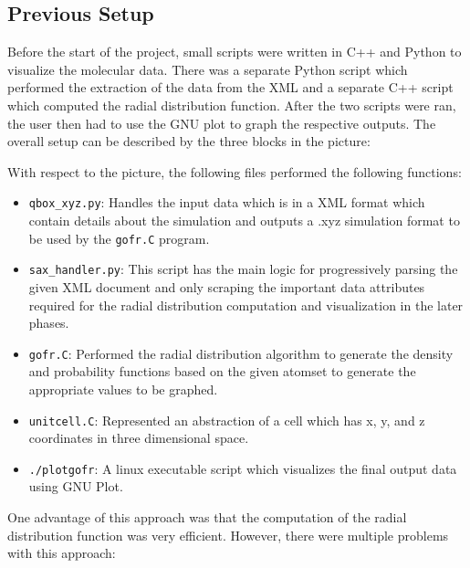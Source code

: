 
\subsection*{Previous Setup}

Before the start of the project, small scripts were written in C++ and Python to visualize the molecular data. There was a separate Python script which performed the extraction of the data from the XML and a separate C++ script which computed the radial distribution function. After the two scripts were ran, the user then had to use the GNU plot to graph the respective outputs. The overall setup can be described by the three blocks in the picture:





With respect to the picture, the following files performed the following functions: 

\begin{itemize}
        
    \item \verb|qbox_xyz.py|: Handles the input data which is in a XML format which contain details about the simulation and outputs a .xyz simulation format to be used by the \verb|gofr.C| program.
    
    \item \verb|sax_handler.py|: This script has the main logic for progressively parsing the given XML document and only scraping the important data attributes required for the radial distribution computation and visualization in the later phases.

    \item \verb|gofr.C|: Performed the radial distribution algorithm to generate the density and probability functions based on the given atomset to generate the appropriate values to be graphed.
    
    \item \verb|unitcell.C|: Represented an abstraction of a cell which has x, y, and z coordinates in three dimensional space.
    
    \item \verb|./plotgofr|: A linux executable script which visualizes the final output data using GNU Plot.
    
\end{itemize}





One advantage of this approach was that the computation of the radial distribution function was very efficient. However, there were multiple problems with this approach:


